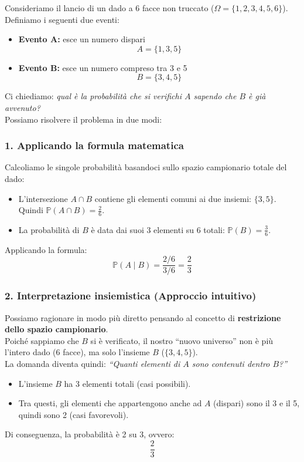 \begin{esempio}

Consideriamo il lancio di un dado a 6 facce non truccato ($\Omega = \{1, 2, 3, 4, 5, 6\}$). Definiamo i seguenti due eventi:
\begin{itemize}
    \item \textbf{Evento A:} esce un numero dispari
    \[ A = \{1, 3, 5\} \]
    \item \textbf{Evento B:} esce un numero compreso tra 3 e 5
    \[ B = \{3, 4, 5\} \]
\end{itemize}

Ci chiediamo: \emph{qual è la probabilità che si verifichi $A$ sapendo che $B$ è già avvenuto?}
\\Possiamo risolvere il problema in due modi:

\subsubsection*{1. Applicando la formula matematica}

Calcoliamo le singole probabilità basandoci sullo spazio campionario totale del dado:
\begin{itemize}
    \item L'intersezione $A \cap B$ contiene gli elementi comuni ai due insiemi: $\{3, 5\}$.
    \\Quindi $\mathbb{P}(A \cap B) = \frac{2}{6}$.
    \item La probabilità di $B$ è data dai suoi 3 elementi su 6 totali: $\mathbb{P}(B) = \frac{3}{6}$.
\end{itemize}

Applicando la formula:
\[
\mathbb{P}(A \mid B) = \frac{2/6}{3/6} = \frac{2}{3}
\]

\subsubsection*{2. Interpretazione insiemistica (Approccio intuitivo)}

Possiamo ragionare in modo più diretto pensando al concetto di \textbf{restrizione dello spazio campionario}.
\\Poiché sappiamo che $B$ si è verificato, il nostro ``nuovo universo'' non è più l'intero dado (6 facce), ma solo l'insieme $B$ ($\{3, 4, 5\}$).
\\La domanda diventa quindi: \emph{``Quanti elementi di $A$ sono contenuti dentro $B$?''}

\begin{itemize}
    \item L'insieme $B$ ha 3 elementi totali (casi possibili).
    \item Tra questi, gli elementi che appartengono anche ad $A$ (dispari) sono il 3 e il 5, quindi sono 2 (casi favorevoli).
\end{itemize}

Di conseguenza, la probabilità è 2 su 3, ovvero:
\[
\frac{2}{3}
\]

\end{esempio}

